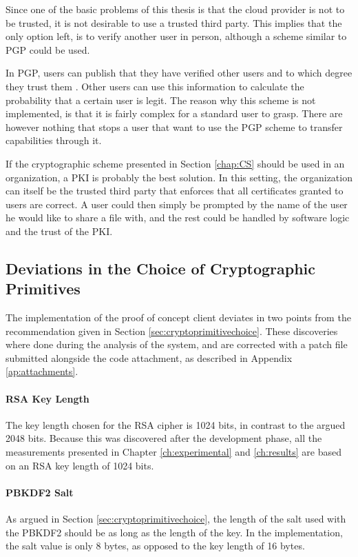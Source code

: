 \documentclass[pdftex,english,10pt,b5paper,twoside]{book}
\begin{document}
Since one of the basic problems of this thesis is that the cloud provider is
not to be trusted, it is not desirable to use a trusted third party. This
implies that the only option left, is to verify another user in person,
although a scheme similar to \ac{PGP} could be used. 

In \ac{PGP}, users can publish that they have verified other users and to which
degree they trust them \cite{stallings}. Other users can use this information
to calculate the probability that a certain user is legit. The reason why this
scheme is not implemented, is that it is fairly complex for a standard user to
grasp. There are however nothing that stops a user that want to use the
\ac{PGP} scheme to transfer capabilities through it.

If the cryptographic scheme presented in Section \ref{chap:CS} should be used
in an organization, a \ac{PKI} is probably the best solution. In this setting,
the organization can itself be the trusted third party that enforces that all
certificates granted to users are correct. A user could then simply be prompted
by the name of the user he would like to share a file with, and the rest could
be handled by software logic and the trust of the \ac{PKI}.

\subsection{Deviations in the Choice of Cryptographic Primitives}

The implementation of the proof of concept client deviates in two points from
the recommendation given in Section \ref{sec:cryptoprimitivechoice}. 
These discoveries where done during the analysis of the system, and are
corrected with a patch file submitted alongside the code attachment, as
described in Appendix \ref{ap:attachments}.

\paragraph{RSA Key Length} The key length chosen for the RSA cipher is 1024
bits, in contrast to the argued 2048 bits. Because this was discovered after
the development phase, all the measurements presented in Chapter
\ref{ch:experimental} and \ref{ch:results} are based on an RSA key length of
1024 bits.

\paragraph{PBKDF2 Salt} As argued in Section \ref{sec:cryptoprimitivechoice},
the length of the salt used with the \ac{PBKDF2} should be as long as the
length of the key. In the implementation, the salt value is only 8 bytes, as
opposed to the key length of 16 bytes.
\end{document}
